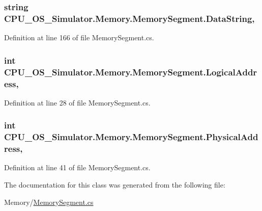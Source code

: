 \subsubsection[{Data\+String}]{\setlength{\rightskip}{0pt plus 5cm}string C\+P\+U\+\_\+\+O\+S\+\_\+\+Simulator.\+Memory.\+Memory\+Segment.\+Data\+String\hspace{0.3cm}{\ttfamily [get]}, {\ttfamily [set]}}\label{class_c_p_u___o_s___simulator_1_1_memory_1_1_memory_segment_a5e2dec75bb2978188d1fb369e4f9e982}


Definition at line 166 of file Memory\+Segment.\+cs.

\hypertarget{class_c_p_u___o_s___simulator_1_1_memory_1_1_memory_segment_a254cb3b68c5ea35ec44a4df264833bf4}{}
\subsubsection[{Logical\+Address}]{\setlength{\rightskip}{0pt plus 5cm}int C\+P\+U\+\_\+\+O\+S\+\_\+\+Simulator.\+Memory.\+Memory\+Segment.\+Logical\+Address\hspace{0.3cm}{\ttfamily [get]}, {\ttfamily [set]}}\label{class_c_p_u___o_s___simulator_1_1_memory_1_1_memory_segment_a254cb3b68c5ea35ec44a4df264833bf4}


Definition at line 28 of file Memory\+Segment.\+cs.

\hypertarget{class_c_p_u___o_s___simulator_1_1_memory_1_1_memory_segment_aeb2f540146dfc353f5529bf846e62587}{}
\subsubsection[{Physical\+Address}]{\setlength{\rightskip}{0pt plus 5cm}int C\+P\+U\+\_\+\+O\+S\+\_\+\+Simulator.\+Memory.\+Memory\+Segment.\+Physical\+Address\hspace{0.3cm}{\ttfamily [get]}, {\ttfamily [set]}}\label{class_c_p_u___o_s___simulator_1_1_memory_1_1_memory_segment_aeb2f540146dfc353f5529bf846e62587}


Definition at line 41 of file Memory\+Segment.\+cs.



The documentation for this class was generated from the following file\+:\begin{DoxyCompactItemize}
\item 
Memory/\hyperlink{_memory_segment_8cs}{Memory\+Segment.\+cs}\end{DoxyCompactItemize}
